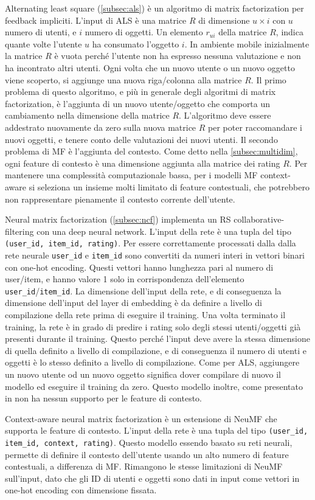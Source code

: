 Alternating least square (\autoref{subsec:als}) è un algoritmo di matrix factorization per feedback impliciti. L'input di ALS è una matrice $R$ di dimensione $u \times i$ con $u$ numero di utenti, e $i$ numero di oggetti. Un elemento $r_{ui}$ della matrice $R$, indica quante volte l'utente $u$ ha consumato l'oggetto $i$. In ambiente mobile inizialmente la matrice $R$ è vuota perché l'utente non ha espresso nessuna valutazione e non ha incontrato altri utenti. Ogni volta che un nuovo utente o un nuovo oggetto viene scoperto, si aggiunge una nuova riga/colonna alla matrice $R$. Il primo problema di questo algoritmo, e più in generale degli algoritmi di matrix factorization, è l'aggiunta di un nuovo utente/oggetto che comporta un cambiamento nella dimensione della matrice $R$. L'algoritmo deve essere addestrato nuovamente da zero sulla nuova matrice $R$ per poter raccomandare i nuovi oggetti, e tenere conto delle valutazioni dei nuovi utenti. Il secondo problema di MF è l'aggiunta del contesto. Come detto nella \autoref{subsec:multidim}, ogni feature di contesto è una dimensione aggiunta alla matrice dei rating $R$. Per mantenere una complessità computazionale bassa, per i modelli MF context-aware si seleziona un insieme molti limitato di feature contestuali, che potrebbero non rappresentare pienamente il contesto corrente dell'utente.

Neural matrix factorization (\autoref{subsec:ncf}) implementa un RS
collaborative-filtering con una deep neural network. L'input della 
rete è una tupla del tipo \texttt{(user\_id, item\_id, rating)}.
Per essere correttamente processati dalla dalla rete neurale \texttt{user\_id} e \texttt{item\_id} sono convertiti da numeri interi in vettori binari con one-hot encoding. Questi vettori hanno lunghezza pari al numero di 
user/item, e hanno valore 1 solo in corrispondenza dell'elemento  
\texttt{user\_id}/\texttt{item\_id}. La dimensione dell'input della rete, e di conseguenza la dimensione dell'input del layer di embedding è da definire a livello di compilazione della rete prima di eseguire il training. Una volta terminato il training, la rete è in grado di predire i rating solo degli stessi utenti/oggetti già presenti durante il training. Questo perché l'input deve avere la stessa dimensione di quella definito a livello di compilazione, e di conseguenza il numero di utenti e oggetti è lo stesso definito a livello di compilazione. Come per ALS, aggiungere un nuovo utente od un nuovo oggetto significa dover compilare di nuovo il modello ed eseguire il training da zero. Questo modello inoltre, come presentato in \cite{NCF} non ha nessun supporto per le feature di contesto.

Context-aware neural matrix factorization è un estensione di NeuMF che supporta le feature di contesto. L'input della rete è una tupla del tipo \texttt{(user\_id, item\_id, context, rating)}. Questo modello essendo basato su reti neurali, permette di definire il contesto dell'utente usando un alto numero di feature contestuali, a differenza di MF. Rimangono le stesse limitazioni di NeuMF sull'input, dato che gli ID di utenti e oggetti sono dati in input come vettori in one-hot encoding con dimensione fissata.
